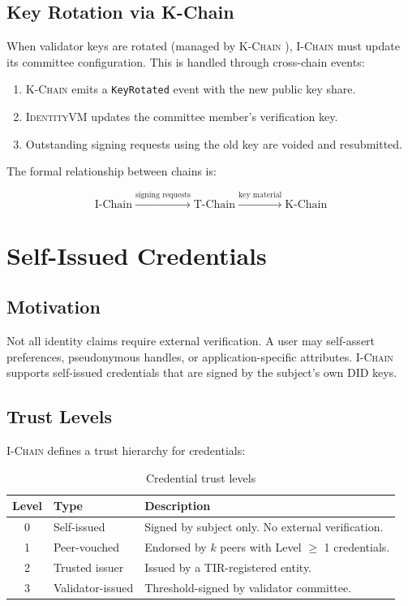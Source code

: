 \documentclass[11pt,letterpaper]{article}
\theoremstyle{definition}
\theoremstyle{remark}
\newcommand{\IChain}{\textsc{I-Chain}}
\newcommand{\KChain}{\textsc{K-Chain}}
\newcommand{\IdentityVM}{\textsc{IdentityVM}}
\begin{document}
\subsection{Key Rotation via K-Chain}

When validator keys are rotated (managed by \KChain{} \cite{zoo-key-management}), \IChain{} must update its committee configuration. This is handled through cross-chain events:

\begin{enumerate}
\item \KChain{} emits a \texttt{KeyRotated} event with the new public key share.
\item \IdentityVM{} updates the committee member's verification key.
\item Outstanding signing requests using the old key are voided and resubmitted.
\end{enumerate}

The formal relationship between chains is:

\begin{equation}
\text{I-Chain} \xrightarrow{\text{signing requests}} \text{T-Chain} \xrightarrow{\text{key material}} \text{K-Chain}
\end{equation}

\section{Self-Issued Credentials}

\subsection{Motivation}

Not all identity claims require external verification. A user may self-assert preferences, pseudonymous handles, or application-specific attributes. \IChain{} supports self-issued credentials that are signed by the subject's own DID keys.

\subsection{Trust Levels}

\IChain{} defines a trust hierarchy for credentials:

\begin{table}[h]
\centering
\begin{tabular}{clp{6cm}}
\toprule
\textbf{Level} & \textbf{Type} & \textbf{Description} \\
\midrule
0 & Self-issued & Signed by subject only. No external verification. \\
1 & Peer-vouched & Endorsed by $k$ peers with Level $\geq$ 1 credentials. \\
2 & Trusted issuer & Issued by a TIR-registered entity. \\
3 & Validator-issued & Threshold-signed by validator committee. \\
\bottomrule
\end{tabular}
\caption{Credential trust levels}
\label{tab:trust-levels}
\end{table}
\end{document}
